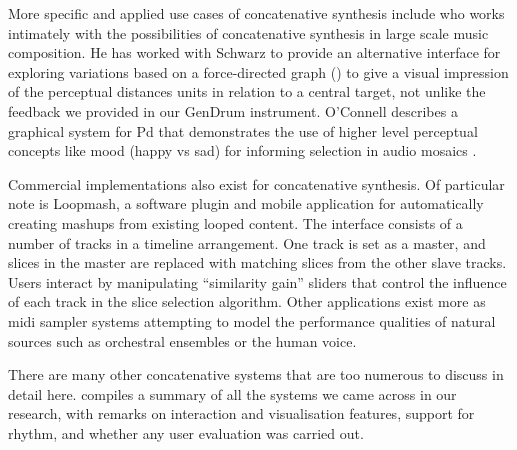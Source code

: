 More specific and applied use cases of concatenative synthesis include \cite{Hackbarth2010} who works intimately with the possibilities of concatenative synthesis in large scale music composition. He has worked with Schwarz to provide an alternative interface for exploring variations based on a force-directed graph () to give a visual impression of the perceptual distances units in relation to a central target, not unlike the feedback we provided in our GenDrum instrument. O’Connell describes a graphical system for Pd that demonstrates the use of higher level perceptual concepts like mood (happy vs sad) for informing selection in audio mosaics \citep{OConnell2011}.

Commercial implementations also exist for concatenative synthesis. Of particular note is Loopmash, a software plugin and mobile application for automatically creating mashups from existing looped content. The interface consists of a number of tracks in a timeline arrangement. One track is set as a master, and slices in the master are replaced with matching slices from the other slave tracks. Users interact by manipulating “similarity gain” sliders that control the influence of each track in the slice selection algorithm. Other applications exist more as \acrshort{midi} sampler systems attempting to model the performance qualities of natural sources such as orchestral ensembles or the human voice.

There are many other concatenative systems that are too numerous to discuss in detail here.  compiles a summary of all the systems we came across in our research, with remarks on interaction and visualisation features, support for rhythm, and whether any user evaluation was carried out.

